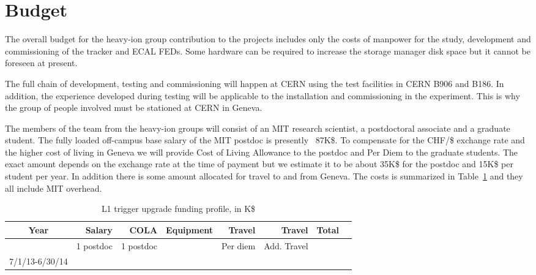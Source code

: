 \section{Budget}
\label{sec:funding}

The overall budget for the heavy-ion group contribution to the projects includes only the costs of manpower for the study, development and commissioning of the tracker and ECAL FEDs. 
Some hardware can be required to increase the storage manager disk space but it cannot be foreseen at present. 


The full chain of development, testing and commissioning will happen at CERN using the test facilities in CERN B906 and B186.
In addition, the experience developed during testing will be applicable to the installation and commissioning in the
experiment. This is why the group of people involved must be stationed at CERN in Geneva.

The members of the team from the heavy-ion groups will consist of an MIT research scientist, a postdoctoral associate and a graduate student.
The fully loaded off-campus base salary of the MIT postdoc is presently ~87K\$. To compensate for the CHF/\$ exchange
rate and the higher cost of living in Geneva we will provide Cost of Living Allowance to the postdoc and Per Diem to the
graduate students. The exact amount depends on the exchange rate at the time of payment but we estimate it to be about
35K\$ for the postdoc and 15K\$ per student per year. In addition there is some amount allocated for travel
to and from Geneva. The costs is summarized in Table~\ref{OpCost} and they all include MIT overhead.

\begin{table}[hbt]
\begin{center}
\begin{tabular}{|c|r|r|r|r|r|r|r|}
\hline
Year        & Salary & COLA & Equipment & Travel & Travel& Total \\ \hline
            &  1 postdoc   & 1 postdoc   &  & Per diem       &  Add. Travel     &     \\ \hline
7/1/13-6/30/14  &     &    &       &   &      &    \\ \hline
\end{tabular}
\end{center}
\caption{L1 trigger upgrade funding profile, in K\$}
\label{OpCost}
\end{table}
